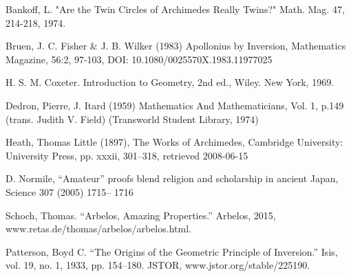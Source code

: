 \documentclass[12pt]{article}
\begin{document}
\newpage
\begin{thebibliography}{}
Bankoff, L. "Are the Twin Circles of Archimedes Really Twins?" Math. Mag. 47, 214-218, 1974.

Bruen, J. C. Fisher & J. B. Wilker (1983) Apollonius by Inversion, Mathematics Magazine, 56:2, 97-103, DOI: 10.1080/0025570X.1983.11977025 

H. S. M. Coxeter. Introduction to Geometry, 2nd ed., Wiley. New York, 1969. 

Dedron, Pierre, J. Itard (1959) Mathematics And Mathematicians, Vol. 1, p.149 (trans. Judith V. Field) (Transworld Student Library, 1974)

 Heath, Thomas Little (1897), The Works of Archimedes, Cambridge University: University Press, pp. xxxii, 301–318, retrieved 2008-06-15

 D. Normile, “Amateur” proofs blend religion and scholarship in ancient Japan, Science 307 (2005) 1715– 1716
 
Schoch, Thomas. “Arbelos, Amazing Properties.” Arbelos, 2015, www.retas.de/thomas/arbelos/arbelos.html.

Patterson, Boyd C. “The Origins of the Geometric Principle of Inversion.” Isis, vol. 19, no. 1, 1933, pp. 154–180. JSTOR, www.jstor.org/stable/225190.


\end{thebibliography}
\end{document}
